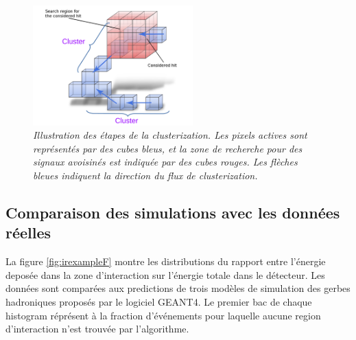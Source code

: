 \begin{figure}
	\centering
	\includegraphics[width=0.55\textwidth]{ECAL/graphics/demo-v3.pdf}
	\caption{\label{fig:democlusterF} \sl Illustration des étapes de la clusterization. Les pixels actives sont représentés par des cubes bleus, et la zone de recherche pour des signaux avoisinés est indiquée par des cubes rouges. Les flèches bleues indiquent la direction du flux de clusterization.}
\end{figure}

\newpage
\subsection*{Comparaison des simulations avec les données réelles}
La figure \ref{fig:irexampleF} montre les distributions du rapport entre l'énergie deposée dans la zone d'interaction sur l'énergie totale dans le détecteur. Les données sont comparées aux predictions de trois modèles de simulation des gerbes hadroniques proposés par le logiciel GEANT4.  
Le premier bac de chaque histogram  réprésent à la fraction d'événements pour laquelle aucune region d'interaction n'est trouvée par l'algorithme.


